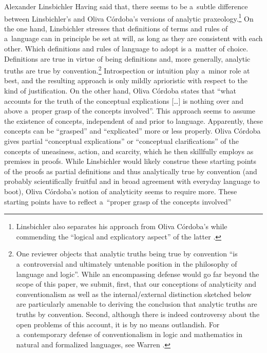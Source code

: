 \begin{artengenv}{Alexander Linsbichler}
Having said that, there seems to be a~subtle difference between Linsbichler's and Oliva Córdoba's versions of analytic praxeology.\footnote{Linsbichler also separates his approach from Oliva Córdoba's while commending the ``logical and explicatory aspect'' of the latter 
\parencite[][p.3374]{linsbichler_austrian_2021}.%
} On the one hand, Linsbichler stresses that definitions of terms and rules of a~language can in principle be set at will, as long as they are consistent with each other. Which definitions and rules of language to adopt is a~matter of choice. Definitions are true in virtue of being definitions and, more generally, analytic truths are true by convention.\footnote{One reviewer objects that analytic truths being true by convention ``is a~controversial and ultimately untenable position in the philosophy of language and logic''. While an encompassing defense would go far beyond the scope of this paper, we submit, first, that our conceptions of analyticity and conventionalism as well as the internal/external distinction sketched below are particularly amenable to deriving the conclusion that analytic truths are truths by convention. Second, although there is indeed controversy about the open problems of this account, it is by no means outlandish. For a~contemporary defense of conventionalism in logic and mathematics in natural and formalized languages, see Warren 
\parencite*[][]{warren_shadows_2020}. %
 } Introspection or intuition play a~minor role at best, and the resulting approach is only mildly aprioristic with respect to the kind of justification. On the other hand, Oliva Córdoba 
\parencite*[][p.527]{oliva_cordoba_uneasiness_2017} %
 states that ``what accounts for the truth of the conceptual explications […] is nothing over and above a~proper grasp of the concepts involved''. This approach seems to assume the existence of concepts, independent of and prior to language. Apparently, these concepts can be ``grasped'' and ``explicated'' more or less properly. Oliva Córdoba 
\parencite*[][]{oliva_cordoba_uneasiness_2017} %
 gives partial ``conceptual explications'' or ``conceptual clarifications'' of the concepts of uneasiness, action, and scarcity, which he then skillfully employs as premises in proofs. While Linsbichler would likely construe these starting points of the proofs as partial definitions and thus analytically true by convention (and probably scientifically fruitful and in broad agreement with everyday language to boot), Oliva Córdoba's notion of analyticity seems to require more. These starting points have to reflect a~``proper grasp of the concepts involved'' 

\end{artengenv}
